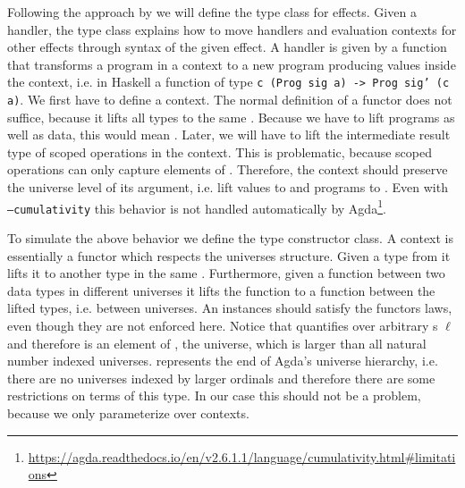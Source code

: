 Following the approach by \citeauthor{DBLP:conf/haskell/WuSH14} we will define the
type class  for effects.
Given a handler, the type class explains how to move handlers and evaluation contexts
for other effects through syntax of the given effect.
A handler is given by a function that transforms a program in a context to a new
program producing values inside the context, i.e. in Haskell a function of type
\texttt{c (Prog sig a) -> Prog sig' (c a)}.
We first have to define a context.
The normal definition of a functor does not suffice, because it lifts all types
to the same .
Because we have to lift programs as well as data, this would mean .
Later, we will have to lift the intermediate result type of scoped operations in
the context.
This is problematic, because scoped operations can only capture elements of
.
Therefore, the context should preserve the universe level of its argument, i.e.
lift values to  and programs to .
Even with \texttt{--cumulativity} this behavior is not handled automatically by
Agda\footnote{\url{https://agda.readthedocs.io/en/v2.6.1.1/language/cumulativity.html\#limitations}}.

To simulate the above behavior we define the  type
constructor class.
A context is essentially a functor which respects the universes structure.
Given a type from  it lifts it to another type in the same
.
Furthermore, given a function between two data types in different universes it
lifts the function to a function between the lifted types, i.e. between
universes.
An instances should satisfy the functors laws, even though they are not enforced
here.
Notice that  quantifies over arbitrary
s $\ell$ and therefore is an element of ,
the universe, which is larger than all natural number indexed universes.
 represents the end of Agda's universe hierarchy, i.e. there
are no universes indexed by larger ordinals and therefore there are some
restrictions on terms of this type.
In our case this should not be a problem, because we only parameterize over
contexts.

